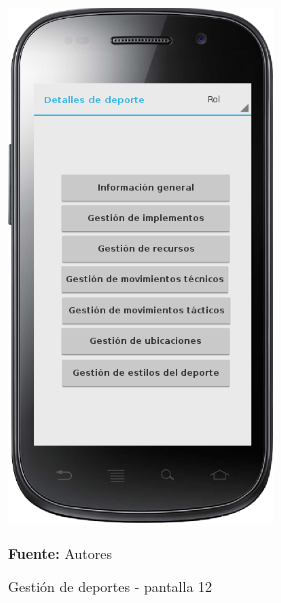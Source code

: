 \begin{figure}[!htb]
  \begin{center}
    \includegraphics[width=7cm]{./imagenes/UI/Deportes/gestion_deportes_12.png}
    \caption{Gestión de deportes - pantalla 12}
    \label{fig:gestion_deportes_12}
    \textbf{Fuente:}  Autores
  \end{center}
\end{figure}

